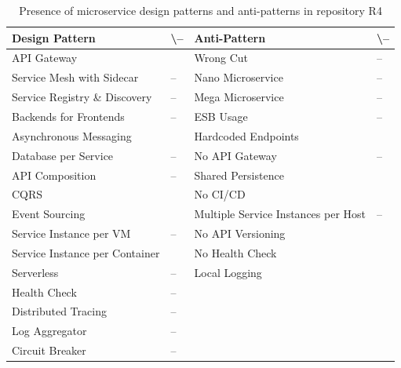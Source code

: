 \documentclass{Configuration_Files/PoliMi3i_thesis}
\newcommand{\cmark}{\ding{51}}%
\begin{document}
\begin{table}[H]
\centering 
    \begin{tabular}{ 
  | >{\centering\arraybackslash} m{16em} 
  | >{\centering\arraybackslash} m{2.2em} 
  | >{\centering\arraybackslash} m{16em} 
  | >{\centering\arraybackslash} m{2.2em} | }
    \hline
    \rowcolor{bluepoli!40}
    \textbf{Design Pattern} & \cmark \textbackslash – & \textbf{Anti-Pattern} & \cmark \textbackslash – \T\B \\
    \hline \hline
    API Gateway & \cmark & Wrong Cut & – \T\B\\
    \hline
    \rowcolor{bluepoli!10}
    Service Mesh with Sidecar & – & Nano Microservice & – \T\B \\
    \hline
    Service Registry \& Discovery & – & Mega Microservice & – \T\B \\
    \hline
    \rowcolor{bluepoli!10}
    Backends for Frontends & – & ESB Usage & – \T\B \\
    \hline
    Asynchronous Messaging & \cmark & Hardcoded Endpoints & \cmark \T\B \\
    \hline
    \rowcolor{bluepoli!10}
    Database per Service & – & No API Gateway & – \T\B \\
    \hline
    API Composition & – & Shared Persistence & \cmark \T\B \\
    \hline
    \rowcolor{bluepoli!10}
    CQRS & \cmark & No CI/CD & \cmark \T\B \\
    \hline
    Event Sourcing & \cmark & Multiple Service Instances per Host & – \T\B \\
    \hline
    \rowcolor{bluepoli!10}
    Service Instance per VM & – & No API Versioning & \cmark \T\B \\
    \hline
    Service Instance per Container & \cmark & No Health Check & \cmark \T\B \\
    \hline
    \rowcolor{bluepoli!10}
    Serverless & – & Local Logging & \cmark \T\B \\
    \hline
    Health Check & – &  & \T\B \\
    \hline
    \rowcolor{bluepoli!10}
    Distributed Tracing & – & & \T\B \\
    \hline
    Log Aggregator & – &  & \T\B \\
    \hline
    \rowcolor{bluepoli!10}
    Circuit Breaker & – &  & \T\B \\
    \hline
    \end{tabular}
    \\[10pt]
    \caption{Presence of microservice design patterns and anti-patterns in repository R4}
    \label{table:R4_result}
\end{table}
\end{document}
